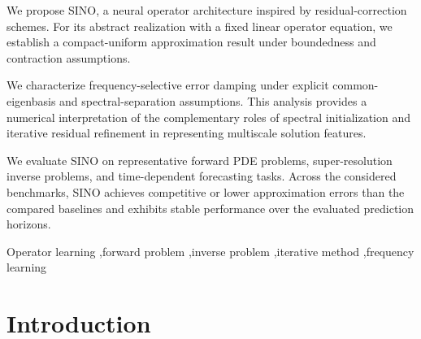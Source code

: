 \documentclass[preprint,numbers,sort&compress]{elsarticle}
\begin{document}
\begin{frontmatter}
		\begin{highlights}
			\item We propose SINO, a neural operator architecture inspired by residual-correction schemes. For its abstract realization with a fixed linear operator equation, we establish a compact-uniform approximation result under boundedness and contraction assumptions.
			\item We characterize frequency-selective error damping under explicit common-eigenbasis and spectral-separation assumptions. This analysis provides a numerical interpretation of the complementary roles of spectral initialization and iterative residual refinement in representing multiscale solution features.
			\item We evaluate SINO on representative forward PDE problems, super-resolution inverse problems, and time-dependent forecasting tasks. Across the considered benchmarks, SINO achieves competitive or lower approximation errors than the compared baselines and exhibits stable performance over the evaluated prediction horizons.
		\end{highlights}
		
		\begin{keyword}
			Operator learning \sep forward problem \sep inverse problem \sep iterative method \sep frequency learning
			
			
			
		\end{keyword}
		
	\end{frontmatter}
	
		
		
		\section{Introduction}\label{sec1}
		
\end{document}
